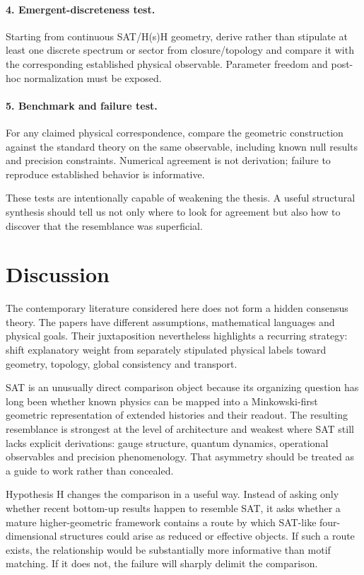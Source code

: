 \documentclass[11pt]{article}
\begin{document}
\paragraph{4. Emergent-discreteness test.} Starting from continuous SAT/H(s)H geometry, derive rather than stipulate at least one discrete spectrum or sector from closure/topology and compare it with the corresponding established physical observable. Parameter freedom and post-hoc normalization must be exposed.

\paragraph{5. Benchmark and failure test.} For any claimed physical correspondence, compare the geometric construction against the standard theory on the same observable, including known null results and precision constraints. Numerical agreement is not derivation; failure to reproduce established behavior is informative.

These tests are intentionally capable of weakening the thesis. A useful structural synthesis should tell us not only where to look for agreement but also how to discover that the resemblance was superficial.

\section{Discussion}
The contemporary literature considered here does not form a hidden consensus theory. The papers have different assumptions, mathematical languages and physical goals. Their juxtaposition nevertheless highlights a recurring strategy: shift explanatory weight from separately stipulated physical labels toward geometry, topology, global consistency and transport.

SAT is an unusually direct comparison object because its organizing question has long been whether known physics can be mapped into a Minkowski-first geometric representation of extended histories and their readout. The resulting resemblance is strongest at the level of architecture and weakest where SAT still lacks explicit derivations: gauge structure, quantum dynamics, operational observables and precision phenomenology. That asymmetry should be treated as a guide to work rather than concealed.

Hypothesis H changes the comparison in a useful way. Instead of asking only whether recent bottom-up results happen to resemble SAT, it asks whether a mature higher-geometric framework contains a route by which SAT-like four-dimensional structures could arise as reduced or effective objects. If such a route exists, the relationship would be substantially more informative than motif matching. If it does not, the failure will sharply delimit the comparison.
\end{document}
